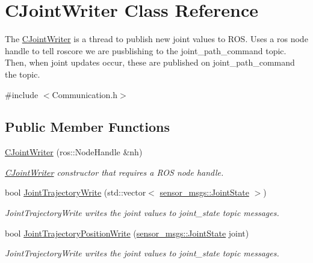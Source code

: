 \hypertarget{classCJointWriter}{\section{C\-Joint\-Writer Class Reference}
\label{classCJointWriter}
}


The \hyperlink{classCJointWriter}{C\-Joint\-Writer} is a thread to publish new joint values to R\-O\-S. Uses a ros node handle to tell roscore we are pusblishing to the joint\-\_\-path\-\_\-command topic. Then, when joint updates occur, these are published on joint\-\_\-path\-\_\-command the topic.  




{\ttfamily \#include $<$Communication.\-h$>$}

\subsection*{Public Member Functions}
\begin{DoxyCompactItemize}
\item 
\hyperlink{classCJointWriter_a15a0d974f05053a4270d4bc12233abaa}{C\-Joint\-Writer} (ros\-::\-Node\-Handle \&nh)
\begin{DoxyCompactList}\small\item\em \hyperlink{classCJointWriter}{C\-Joint\-Writer} constructor that requires a R\-O\-S node handle. \end{DoxyCompactList}\item 
bool \hyperlink{classCJointWriter_adc81d4ad1fee998f98a9e6eba6066da8}{Joint\-Trajectory\-Write} (std\-::vector$<$ \hyperlink{RCS_8h_aa4adb93a26caa4dacba9c9614e283245}{sensor\-\_\-msgs\-::\-Joint\-State} $>$)
\begin{DoxyCompactList}\small\item\em Joint\-Trajectory\-Write writes the joint values to joint\-\_\-state topic messages. \end{DoxyCompactList}\item 
bool \hyperlink{classCJointWriter_a16ffa1605dd37808b21c5082e03a9ba0}{Joint\-Trajectory\-Position\-Write} (\hyperlink{RCS_8h_aa4adb93a26caa4dacba9c9614e283245}{sensor\-\_\-msgs\-::\-Joint\-State} joint)
\begin{DoxyCompactList}\small\item\em Joint\-Trajectory\-Write writes the joint values to joint\-\_\-state topic messages. \end{DoxyCompactList}\end{DoxyCompactItemize}
